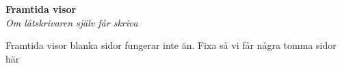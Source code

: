 \begin{center}
    \vspace*{1.5cm}
    {\fontsize{20}{20}\textbf{Framtida visor}}\\
    \vspace{0.7cm}
    {\fontsize{12}{12}\textit{Om låtskrivaren själv får skriva}}
\end{center}
\noBackground

\newpage
\resetBackground

\newpage
\resetBackground

\newpage
\resetBackground

\empty
\empty
\empty

Framtida visor blanka sidor fungerar inte än. Fixa så vi får några tomma sidor här